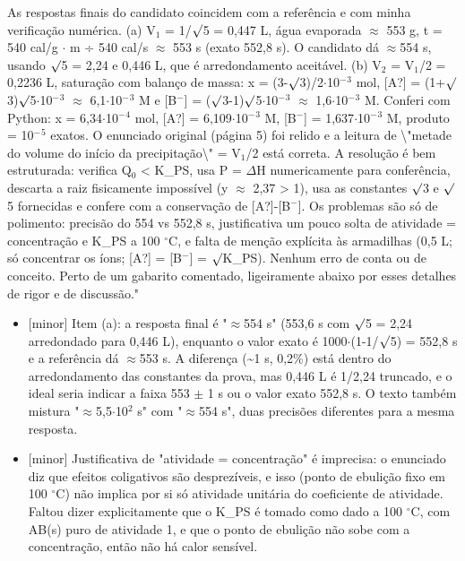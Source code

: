 \documentclass{article}%
\begin{document}
As respostas finais do candidato coincidem com a referência e com minha verificação numérica. (a) V$_{1}$ = 1/$\surd$5 = 0,447 L, água evaporada $\approx$ 553 g, t = 540 cal/g $\cdot$ m ÷ 540 cal/s $\approx$ 553 s (exato 552,8 s). O candidato dá $\approx$554 s, usando $\surd$5 = 2,24 e 0,446 L, que é arredondamento aceitável. (b) V$_{2}$ = V$_{1}$/2 = 0,2236 L, saturação com balanço de massa: x = (3-$\surd$3)/2$\cdot$10$^{-}$$^3$ mol, {[}A?{]} = (1+$\surd$3)$\surd$5$\cdot$10$^{-}$$^3$ $\approx$ 6,1$\cdot$10$^{-}$$^3$ M e {[}B$^{-}${]} = ($\surd$3-1)$\surd$5$\cdot$10$^{-}$$^3$ $\approx$ 1,6$\cdot$10$^{-}$$^3$ M. Conferi com Python: x = 6,34$\cdot$10$^{-}$$^{4}$ mol, {[}A?{]} = 6,109$\cdot$10$^{-}$$^3$ M, {[}B$^{-}${]} = 1,637$\cdot$10$^{-}$$^3$ M, produto = 10$^{-}$$^{5}$ exatos. O enunciado original (página 5) foi relido e a leitura de \textbackslash{}"metade do volume do início da precipitação\textbackslash{}" = V$_{1}$/2 está correta. A resolução é bem estruturada: verifica Q$_{0}$ < K\_PS, usa P = $\Delta$H numericamente para conferência, descarta a raiz fisicamente impossível (y $\approx$ 2,37 > 1), usa as constantes $\surd$3 e $\surd$5 fornecidas e confere com a conservação de {[}A?{]}-{[}B$^{-}${]}. Os problemas são só de polimento: precisão do 554 vs 552,8 s, justificativa um pouco solta de atividade = concentração e K\_PS a 100 $^\circ$C, e falta de menção explícita às armadilhas (0,5 L; só concentrar os íons; {[}A?{]} = {[}B$^{-}${]} = $\surd$K\_PS). Nenhum erro de conta ou de conceito. Perto de um gabarito comentado, ligeiramente abaixo por esses detalhes de rigor e de discussão."%
\begin{itemize}%
\item%
{[}minor{]} Item (a): a resposta final é "$\approx$554 s" (553,6 s com $\surd$5 = 2,24 arredondado para 0,446 L), enquanto o valor exato é 1000$\cdot$(1-1/$\surd$5) = 552,8 s e a referência dá $\approx$553 s. A diferença (\textasciitilde{}1 s, 0,2\%) está dentro do arredondamento das constantes da prova, mas 0,446 L é 1/2,24 truncado, e o ideal seria indicar a faixa 553 $\pm$ 1 s ou o valor exato 552,8 s. O texto também mistura "$\approx$5,5$\cdot$10$^2$ s" com "$\approx$554 s", duas precisões diferentes para a mesma resposta.%
\item%
{[}minor{]} Justificativa de "atividade = concentração" é imprecisa: o enunciado diz que efeitos coligativos são desprezíveis, e isso (ponto de ebulição fixo em 100 $^\circ$C) não implica por si só atividade unitária do coeficiente de atividade. Faltou dizer explicitamente que o K\_PS é tomado como dado a 100 $^\circ$C, com AB(s) puro de atividade 1, e que o ponto de ebulição não sobe com a concentração, então não há calor sensível.%

\end{itemize}$$
\end{document}
